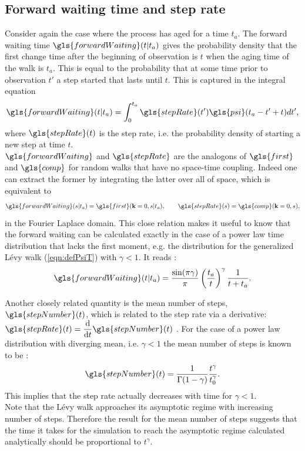 \subsection{Forward waiting time and step rate}

Consider again the case where the process has aged for a time $t_a$. The forward waiting time $\gls{forwardWaiting}(t|t_a)$ gives the probability density that the first change time after the beginning of observation is $t$ when the aging time of the walk is $t_a$. This is equal to the probability that at some time prior to observation $t'$ a step started that lasts until $t$. This is captured in the integral equation 
%
\begin{align}
\gls{forwardWaiting}(t|t_a) = \int^{t_a}_{0} \gls{stepRate}(t') \gls{psi}(t_a-t'+t) dt',
\end{align}
%
where $\gls{stepRate}(t)$ is the step rate, i.e. the probability density of starting a new step at time $t$. \\
$\gls{forwardWaiting}$ and $\gls{stepRate}$ are the analogons of $\gls{first}$ and $\gls{comp}$ for random walks that have no space-time coupling. Indeed one can extract the former by integrating the latter over all of space, which is equivalent to
%
\begin{align}
\gls{forwardWaiting}(s|t_a) = \gls{first}(\ve{k}=0,s|t_a), \qquad \gls{stepRate}(s) = \gls{comp}(\ve{k}=0,s)  ,
\end{align}
%
in the Fourier Laplace domain. This close relation makes it useful to know that the forward waiting can be calculated exactly in the case of a power law time distribution that lacks the first moment, e.g. the distribution for the generalized L\'evy walk (\ref{eqn:defPsiT}) with $\gamma < 1$.  It reads \cite{firstSteps}:
%
\begin{align}
\gls{forwardWaiting}(t|t_a) = \frac{\sin(\pi \gamma)}{\pi} \left( \frac{t_a}{t} \right)^{\gamma} \frac{1}{t+t_a} \label{eqn:forwardWaiting} .
\end{align}

Another closely related quantity is the mean number of steps, $\gls{stepNumber} (t)$, which is related to the step rate via a derivative: {\color{red} 
$\gls{stepRate}(t) = \der{}{t} \gls{stepNumber} (t)$ 
}. For the case of a power law distribution with diverging mean, i.e. $\gamma <1$ the mean number of steps is known to be \cite{firstSteps}:
%
\begin{align}
\gls{stepNumber} (t) = \frac{1}{\Gamma(1-\gamma)} \frac{t^{\gamma}}{t_0^{\gamma}} . 
\end{align}
%
This implies that the step rate actually decreases with time for $\gamma < 1$.\\
Note that the L\'evy walk approaches its asymptotic regime with increasing number of steps. Therefore the result for the mean number of steps suggests that the time it takes for the simulation to reach the asymptotic regime calculated analytically should be proportional to $t^{\gamma}$.


